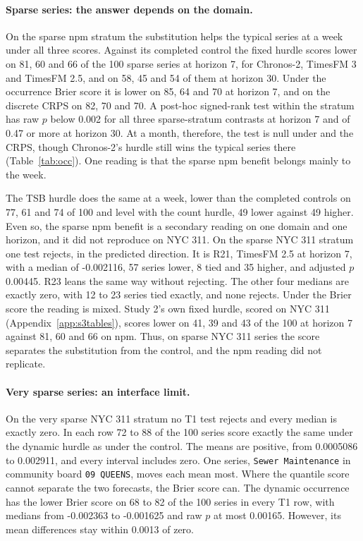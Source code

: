 \paragraph{Sparse series: the answer depends on the domain.} On the sparse npm stratum the substitution helps
the typical series at a week under all three scores. Against its completed control the fixed hurdle scores
lower on 81, 60 and 66 of the 100 sparse series at horizon 7, for Chronos-2, TimesFM 3 and TimesFM 2.5, and on
58, 45 and 54 of them at horizon 30. Under the occurrence Brier score it is lower on 85, 64 and 70 at horizon
7, and on the discrete CRPS on 82, 70 and 70. A post-hoc signed-rank test within the stratum has raw $p$ below
0.002 for all three sparse-stratum contrasts at horizon 7 and of 0.47 or more at horizon 30. At a month,
therefore, the test is null under \qs{} and the CRPS, though Chronos-2's hurdle still wins the typical series
there (Table~\ref{tab:occ}). One reading is that the sparse npm benefit belongs mainly to the week.

The TSB hurdle does the same at a week, lower than the completed controls on 77, 61 and 74 of 100 and level
with the count hurdle, 49 lower against 49 higher. Even so, the sparse npm benefit is a secondary reading on
one domain and one horizon, and it did not reproduce on NYC 311. On the sparse NYC 311 stratum one test
rejects, in the predicted direction. It is R21, TimesFM 2.5 at horizon 7, with a median of -0.002116, 57
series lower, 8 tied and 35 higher, and adjusted $p$ 0.00445. R23 leans the same way without rejecting. The
other four medians are exactly zero, with 12 to 23 series tied exactly, and none rejects. Under the Brier
score the reading is mixed. Study 2's own fixed hurdle, scored on NYC 311 (Appendix~\ref{app:s3tables}),
scores lower on 41, 39 and 43 of the 100 at horizon 7 against 81, 60 and 66 on npm. Thus, on sparse NYC 311
series the score separates the substitution from the control, and the npm reading did not replicate.

\paragraph{Very sparse series: an interface limit.} On the very sparse NYC 311 stratum no T1 test rejects and
every median is exactly zero. In each row 72 to 88 of the 100 series score exactly the same under the dynamic
hurdle as under the control. The means are positive, from 0.0005086 to 0.002911, and every interval includes
zero. One series, \texttt{Sewer Maintenance} in community board \texttt{09 QUEENS}, moves each mean most.
Where the quantile score cannot separate the two forecasts, the Brier score can. The dynamic occurrence has
the lower Brier score on 68 to 82 of the 100 series in every T1 row, with medians from -0.002363 to -0.001625
and raw $p$ at most 0.00165. However, its mean differences stay within 0.0013 of zero.

